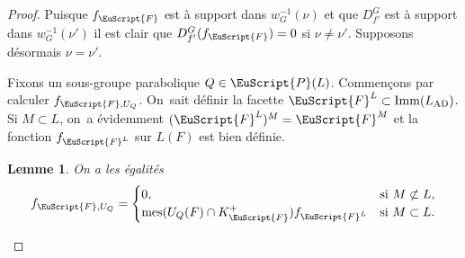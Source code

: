 \documentclass[JEP,XML,SOM,Unicode,francais]{cedram}
\let\mathcal \EuScript
\newcommand{\AD}{\mathrm{AD}}
\newcommand{\Imm}{\mathrm{Imm}}
\DeclareMathOperator{\mes}{mes}
\newcommand{\cF}{\mathcal{F}}
\newcommand{\cP}{\mathcal{P}}
\theoremstyle{plain}
\newtheorem{lem}{Lemme}
\theoremstyle{definition}
\begin{document}
\begin{proof}
Puisque $f_{\cF}$ est à support dans $w_{G}^{-1}(\nu)$ et que $D^G_{f'}$ est à support dans $w_{G}^{-1}(\nu')$ il est clair que $D^G_{f'}(f_{\cF})=0$ si $\nu\neq\nu'$. Supposons désormais $\nu=\nu'$.

Fixons un sous-groupe parabolique $Q\in \cP(L)$. Commençons par calculer $f_{\cF,U_{Q}}$. On~sait définir la facette $\cF^L\subset \Imm(L_{\AD})$. Si $M\subset L$, on~a évidemment $(\cF^L)^M=\cF^M$ et la fonction $f_{\cF^L}$ sur $L(F)$ est bien définie.

\begin{lem}\label{lem1}
On a les égalités
\[
f_{\cF,U_{Q}}=\begin{cases}0,&\text{si } M\not\subset L,\\
\mes(U_{Q}(F)\cap K_{\cF}^+)f_{\cF^L}&\text{si } M\subset L. \end{cases}
\]
\end{lem}


\end{proof}
\end{document}

